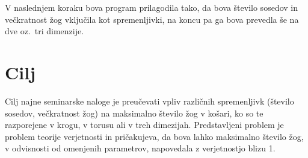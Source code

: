 \documentclass[a4paper, 11pt]{article}
\begin{document}
\noindent V naslednjem koraku bova program prilagodila tako, da bova število sosedov in večkratnost žog vključila kot spremenljivki,
na koncu pa ga bova prevedla še na dve oz.\ tri dimenzije.

\section{Cilj}
Cilj najne seminarske naloge je preučevati vpliv različnih spremenljivk (število sosedov, večkratnost žog) na maksimalno število žog
v košari, ko so te razporejene v krogu, v torusu ali v treh dimezijah. Predstavljeni problem je problem teorije verjetnosti in pričakujeva,
da bova lahko maksimalno število žog, v odvisnosti od omenjenih parametrov, napovedala z verjetnostjo blizu 1.
\end{document}
